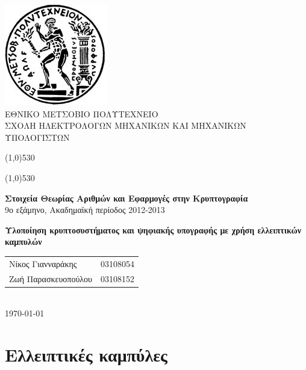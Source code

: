 \documentclass[12pt]{article}
\begin{document}
\begin{titlepage}
\begin{center}

\includegraphics[scale=0.3]{pyrforos.jpg}\\
ΕΘΝΙΚΟ ΜΕΤΣΟΒΙΟ ΠΟΛΥΤΕΧΝΕΙΟ \\
ΣΧΟΛΗ ΗΛΕΚΤΡΟΛΟΓΩΝ ΜΗΧΑΝΙΚΩΝ KΑΙ ΜΗΧΑΝΙΚΩΝ ΥΠΟΛΟΓΙΣΤΩΝ \\ 
\vspace{0.5em}

\medskip 

\def\doubleline{

    \vspace{0.1em}
    \line(1,0){530}\

    \vspace{-1.5em}
    \line(1,0){530}

}
\doubleline
\vspace{1.3em}

{\large \textbf{Στοιχεία Θεωρίας Αριθμών και Εφαρμογές στην Κρυπτογραφία}\\
 \medskip
9ο εξάμηνο, Ακαδημαϊκή περίοδος 2012-2013 \\ \bigskip \medskip}

\vspace{1.5em}
{\LARGE \textbf{Υλοποίηση κρυπτοσυστήματος και ψηφιακής υπογραφής με χρήση ελλειπτικών καμπυλών\\}}
\vspace{32em}

\begin{tabular}{l l}
Νίκος Γιανναράκης & 03108054 \\
Ζωή Παρασκευοπούλου & 03108152 \\
\end{tabular}\\
\bigskip
\today
\end{center}
\end{titlepage}
\tableofcontents

\pagebreak

\section{Ελλειπτικές καμπύλες}
\end{document}
